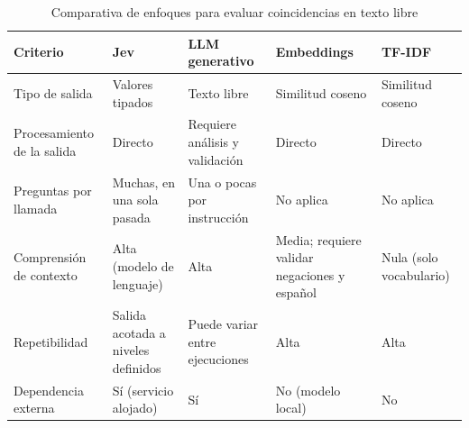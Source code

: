 \begin{table}[htbp]
\centering
\small
\renewcommand{\arraystretch}{1.2}
\caption{Comparativa de enfoques para evaluar coincidencias en texto libre}
\label{tab:comp-texto}
\begin{tabularx}{\textwidth}{L{0.18\textwidth}XXXX}
\toprule
{} \color{white}\textbf{Criterio} & \color{white}\textbf{Jev} & \color{white}\textbf{LLM generativo} & \color{white}\textbf{Embeddings} & \color{white}\textbf{TF-IDF} \\
\midrule
Tipo de salida & Valores tipados & Texto libre & Similitud coseno & Similitud coseno \\
Procesamiento de la salida & Directo & Requiere análisis y validación & Directo & Directo \\
Preguntas por llamada & Muchas, en una sola pasada & Una o pocas por instrucción & No aplica & No aplica \\
Comprensión de contexto & Alta (modelo de lenguaje) & Alta & Media; requiere validar negaciones y español & Nula (solo vocabulario) \\
Repetibilidad & Salida acotada a niveles definidos & Puede variar entre ejecuciones & Alta & Alta \\
Dependencia externa & Sí (servicio alojado) & Sí & No (modelo local) & No \\
\bottomrule
\end{tabularx}
\end{table}

\endinput

